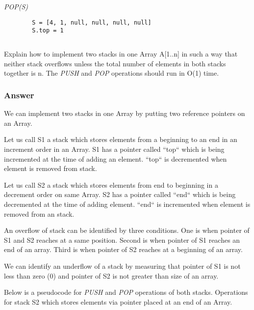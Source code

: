       \textit{POP(S)}

      \begin{verbatim}
        S = [4, 1, null, null, null, null]
        S.top = 1
      \end{verbatim}

      \subsection{}

      Explain how to implement two stacks in one Array A[1..n] in such a way
      that neither stack overflows unless the total number of elements in both
      stacks together is n. The \textit{PUSH} and \textit{POP} operations
      should run in O(1) time.

        \subsubsection {Answer}

        We can implement two stacks in one Array by putting two reference
        pointers on an Array.

        Let us call S1 a stack which stores elements from a beginning to an end
        in an increment order in an Array. S1 has a pointer called ``top``
        which is being incremented at the time of adding an element. ``top`` is
        decremented when element is removed from stack.

        Let us call S2 a stack which stores elements from end to beginning in a
        decrement order on same Array. S2 has a pointer called ``end`` which is
        being decremented at the time of adding element. ``end`` is incremented
        when element is removed from an stack.

        An overflow of stack can be identified by three conditions. One is when
        pointer of S1 and S2 reaches at a same position. Second is when pointer
        of S1 reaches an end of an array. Third is when pointer of S2 reaches
        at a beginning of an array.

        We can identify an underflow of a stack by measuring that pointer of S1
        is not less than zero (0) and pointer of S2 is not greater than size of
        an array.

        Below is a pseudocode for \textit{PUSH} and \textit{POP} operations of
        both stacks. Operations for stack S2 which stores elements via pointer
        placed at an end of an Array.

